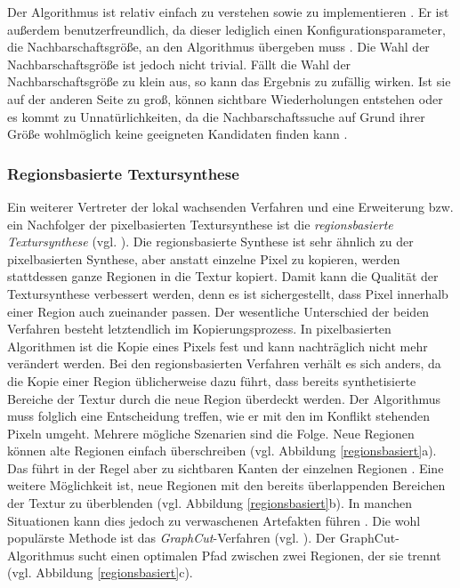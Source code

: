 Der Algorithmus \cite{EL99} ist relativ einfach zu verstehen sowie zu implementieren \cite{StateOfTheArt}.
Er ist außerdem benutzerfreundlich, da dieser lediglich einen Konfigurationsparameter, die Nachbarschaftsgröße, an den Algorithmus übergeben muss \cite{EL99}.
Die Wahl der Nachbarschaftsgröße ist jedoch nicht trivial.
Fällt die Wahl der Nachbarschaftsgröße zu klein aus, so kann das Ergebnis zu zufällig wirken.
Ist sie auf der anderen Seite zu groß, können sichtbare Wiederholungen entstehen oder es kommt zu Unnatürlichkeiten, da die Nachbarschaftssuche auf Grund ihrer Größe wohlmöglich keine geeigneten Kandidaten finden kann \cite{StateOfTheArt}.

\subsubsection{Regionsbasierte Textursynthese}

Ein weiterer Vertreter der lokal wachsenden Verfahren und eine Erweiterung bzw. ein Nachfolger der pixelbasierten Textursynthese ist die \emph{regionsbasierte Textursynthese} (vgl. \cite{StateOfTheArt}).
Die regionsbasierte Synthese ist sehr ähnlich zu der pixelbasierten Synthese, aber anstatt einzelne Pixel zu kopieren, werden stattdessen ganze Regionen in die Textur kopiert.
Damit kann die Qualität der Textursynthese verbessert werden, denn es ist sichergestellt, dass Pixel innerhalb einer Region auch zueinander passen.
Der wesentliche Unterschied der beiden Verfahren besteht letztendlich im Kopierungsprozess.
In pixelbasierten Algorithmen ist die Kopie eines Pixels fest und kann nachträglich nicht mehr verändert werden.
Bei den regionsbasierten Verfahren verhält es sich anders, da die Kopie einer Region üblicherweise dazu führt, dass bereits synthetisierte Bereiche der Textur durch die neue Region überdeckt werden.
Der Algorithmus muss folglich eine Entscheidung treffen, wie er mit den im Konflikt stehenden Pixeln umgeht.
Mehrere mögliche Szenarien sind die Folge.
Neue Regionen können alte Regionen einfach überschreiben (vgl. Abbildung \ref{regionsbasiert}a).
Das führt in der Regel aber zu sichtbaren Kanten der einzelnen Regionen \cite{StateOfTheArt}.
Eine weitere Möglichkeit ist, neue Regionen mit den bereits überlappenden Bereichen der Textur zu überblenden (vgl. Abbildung \ref{regionsbasiert}b).
In manchen Situationen kann dies jedoch zu verwaschenen Artefakten führen \cite{StateOfTheArt}.
Die wohl populärste Methode ist das \emph{GraphCut}-Verfahren (vgl. \cite{GraphCut, StateOfTheArt}).
Der GraphCut-Algorithmus sucht einen optimalen Pfad zwischen zwei Regionen, der sie trennt (vgl. Abbildung \ref{regionsbasiert}c).

